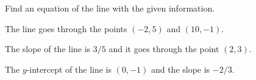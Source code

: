 \begin{activity}\label{A:0.1.2}
Find an equation of the line with the given information.
\ba
\item The line goes through the points $(-2,5)$ and $(10,-1)$.
\item The slope of the line is $3/5$ and it goes through the point $(2,3)$.
\item The $y$-intercept of the line is $(0,-1)$ and the slope is $-2/3$.
\ea

\end{activity}\aftera
